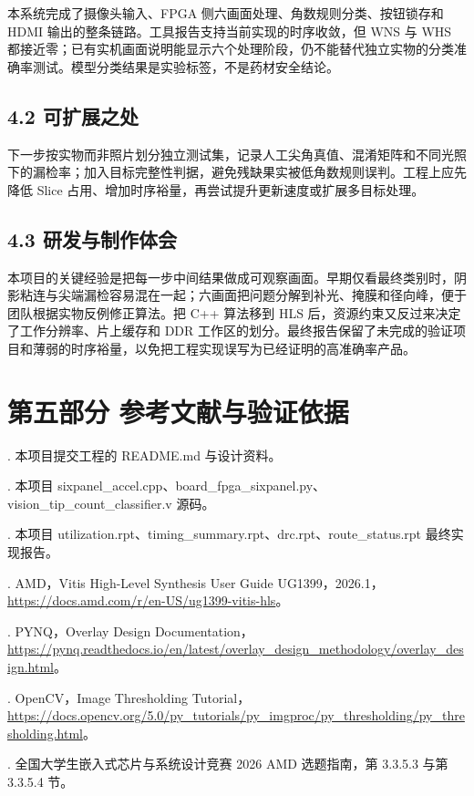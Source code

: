 \documentclass[UTF8,fontset=windows,a4paper,11pt]{ctexart}
\begin{document}
本系统完成了摄像头输入、FPGA 侧六画面处理、角数规则分类、按钮锁存和 HDMI 输出的整条链路。工具报告支持当前实现的时序收敛，但 WNS 与 WHS 都接近零；已有实机画面说明能显示六个处理阶段，仍不能替代独立实物的分类准确率测试。模型分类结果是实验标签，不是药材安全结论。\par

\subsection*{4.2 可扩展之处}

下一步按实物而非照片划分独立测试集，记录人工尖角真值、混淆矩阵和不同光照下的漏检率；加入目标完整性判据，避免残缺果实被低角数规则误判。工程上应先降低 Slice 占用、增加时序裕量，再尝试提升更新速度或扩展多目标处理。\par

\clearpage

\subsection*{4.3 研发与制作体会}

本项目的关键经验是把每一步中间结果做成可观察画面。早期仅看最终类别时，阴影粘连与尖端漏检容易混在一起；六画面把问题分解到补光、掩膜和径向峰，便于团队根据实物反例修正算法。把 C++ 算法移到 HLS 后，资源约束又反过来决定了工作分辨率、片上缓存和 DDR 工作区的划分。最终报告保留了未完成的验证项目和薄弱的时序裕量，以免把工程实现误写为已经证明的高准确率产品。\par

\section*{第五部分 参考文献与验证依据}

. 本项目提交工程的 README.md 与设计资料。\par

. 本项目 sixpanel\_accel.cpp、board\_fpga\_sixpanel.py、vision\_tip\_count\_classifier.v 源码。\par

. 本项目 utilization.rpt、timing\_summary.rpt、drc.rpt、route\_status.rpt 最终实现报告。\par

. AMD，Vitis High-Level Synthesis User Guide UG1399，2026.1，\url{https://docs.amd.com/r/en-US/ug1399-vitis-hls}。\par

. PYNQ，Overlay Design Documentation，\url{https://pynq.readthedocs.io/en/latest/overlay_design_methodology/overlay_design.html}。\par

. OpenCV，Image Thresholding Tutorial，\url{https://docs.opencv.org/5.0/py_tutorials/py_imgproc/py_thresholding/py_thresholding.html}。\par

. 全国大学生嵌入式芯片与系统设计竞赛 2026 AMD 选题指南，第 3.3.5.3 与第 3.3.5.4 节。\par
\end{document}
